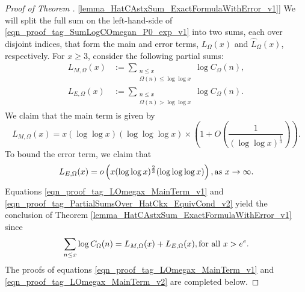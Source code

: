 \documentclass[11pt,reqno,a4letter]{article}
\newcommand{\hlocalref}[1]{\hyperref[#1]{\ref{#1}}}
\numberwithin{equation}{section}
\numberwithin{figure}{section}
\numberwithin{table}{section}
\theoremstyle{plain}
\numberwithin{theorem}{section}
\theoremstyle{definition}
\theoremstyle{remark}
\newcommand{\mathtext}[1]{\text{\rm #1}}
\begin{document}
\begin{proof}[Proof of Theorem \hlocalref{lemma_HatCAstxSum_ExactFormulaWithError_v1}]  
We will split the full sum on the left-hand-side of 
\eqref{eqn_proof_tag_SumLogCOmegan_P0_exp_v1} into two sums, 
each over disjoint indices, that form the main and error terms, 
$L_{\Omega}(x)$ and $\widehat{L}_{\Omega}(x)$, respectively.
For $x \geq 3$, consider the following partial sums:
\begin{align*}
L_{M,\Omega}(x) & := 
	\sum_{\substack{n \leq x \\ \Omega(n) \leq \log\log x}} \log C_{\Omega}(n), \\ 
L_{E,\Omega}(x) & := 
	\sum_{\substack{n \leq x \\ \Omega(n) >\log\log x}} 
	\log C_{\Omega}(n).
\end{align*}
We claim that the main term is given by 
\begin{equation}
\label{eqn_proof_tag_LOmegax_MainTerm_v1}
L_{M,\Omega}(x) = 
	x (\log\log x)(\log\log\log x) \times \left(1 + 
     O\left(\frac{1}{(\log\log x)^{\frac{1}{3}}}\right)\right).
\end{equation}
To bound the error term, we claim that 
\begin{equation}
\label{eqn_proof_tag_PartialSumsOver_HatCkx_EquivCond_v2}
L_{E,\Omega}(x) = o\left(x (\log\log x)^{\frac{2}{3}} (\log\log\log x)\right), 
     \mathtext{ as } x \rightarrow \infty. 
\end{equation}
Equations \eqref{eqn_proof_tag_LOmegax_MainTerm_v1} and 
\eqref{eqn_proof_tag_PartialSumsOver_HatCkx_EquivCond_v2} 
yield the conclusion of 
Theorem \hlocalref{lemma_HatCAstxSum_ExactFormulaWithError_v1} since 
\[
\sum_{n \leq x} \log C_{\Omega}(n) = L_{M,\Omega}(x) + L_{E,\Omega}(x), 
     \mathtext{ for all } x > e^e. 
\]
The proofs of equations \eqref{eqn_proof_tag_LOmegax_MainTerm_v1} and 
\eqref{eqn_proof_tag_LOmegax_MainTerm_v2} are completed below. 
\end{proof}
\end{document}
